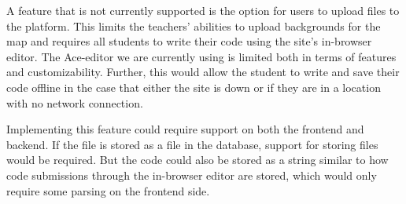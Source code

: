 A feature that is not currently supported is the option for users to upload files to the platform. This limits the teachers' abilities to upload backgrounds for the map and requires all students to write their code using the site's in-browser editor. The Ace-editor we are currently using is limited both in terms of features and customizability. Further, this would allow the student to write and save their code offline in the case that either the site is down or if they are in a location with no network connection.

Implementing this feature could require support on both the frontend and backend. If the file is stored as a file in the database, support for storing files would be required. But the code could also be stored as a string similar to how code submissions through the in-browser editor are stored, which would only require some parsing on the frontend side.
